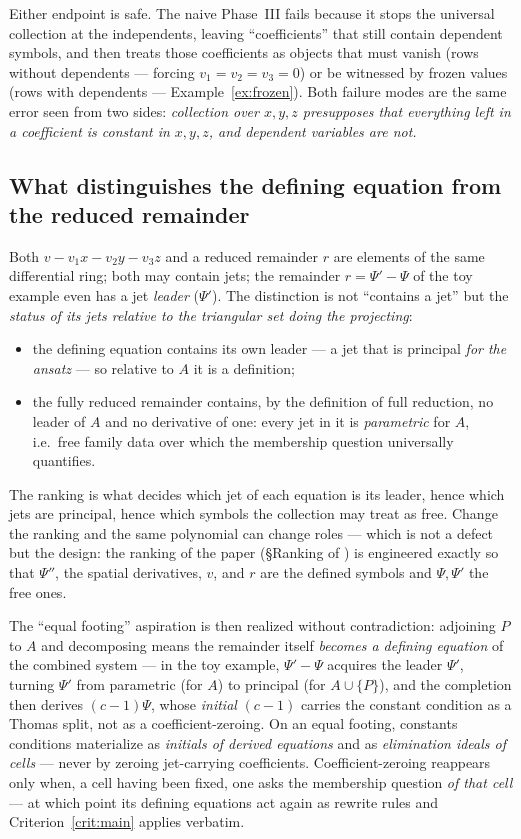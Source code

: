 \documentclass[11pt]{article}
\newcommand{\Psib}{\Psi}
\begin{document}
Either endpoint is safe. The naive Phase~III fails because it stops the
universal collection at the independents, leaving ``coefficients'' that still
contain dependent symbols, and then treats those coefficients as objects that
must vanish (rows without dependents --- forcing $v_1=v_2=v_3=0$) or be
witnessed by frozen values (rows with dependents --- Example~\ref{ex:frozen}).
Both failure modes are the same error seen from two sides: \emph{collection
over $x,y,z$ presupposes that everything left in a coefficient is constant in
$x,y,z$, and dependent variables are not.}

\subsection{What distinguishes the defining equation from the reduced
remainder}

Both $v - v_1x-v_2y-v_3z$ and a reduced remainder $r$ are elements of the same
differential ring; both may contain jets; the remainder $r = \Psib'-\Psib$ of
the toy example even has a jet \emph{leader} ($\Psib'$). The distinction is
not ``contains a jet'' but the \emph{status of its jets relative to the
triangular set doing the projecting}:
\begin{itemize}
\item the defining equation contains its own leader --- a jet that is
  principal \emph{for the ansatz} --- so relative to $A$ it is a definition;
\item the fully reduced remainder contains, by the definition of full
  reduction, no leader of $A$ and no derivative of one: every jet in it is
  \emph{parametric} for $A$, i.e.\ free family data over which the membership
  question universally quantifies.
\end{itemize}
The ranking is what decides which jet of each equation is its leader, hence
which jets are principal, hence which symbols the collection may treat as
free. Change the ranking and the same polynomial can change roles ---
which is not a defect but the design: the ranking of the paper
(\S{}Ranking of \cite{NewMethod}) is engineered exactly so that $\Psib''$,
the spatial derivatives, $v$, and $r$ are the defined symbols and
$\Psib,\Psib'$ the free ones.

The ``equal footing'' aspiration is then realized without contradiction:
adjoining $P$ to $A$ and decomposing means the remainder itself \emph{becomes
a defining equation} of the combined system --- in the toy example,
$\Psib'-\Psib$ acquires the leader $\Psib'$, turning $\Psib'$ from parametric
(for $A$) to principal (for $A\cup\{P\}$), and the completion then derives
$(c-1)\Psib$, whose \emph{initial} $(c-1)$ carries the constant condition as a
Thomas split, not as a coefficient-zeroing. On an equal footing, constants
conditions materialize as \emph{initials of derived equations} and as
\emph{elimination ideals of cells} --- never by zeroing jet-carrying
coefficients. Coefficient-zeroing reappears only when, a cell having been
fixed, one asks the membership question \emph{of that cell} --- at which point
its defining equations act again as rewrite rules and
Criterion~\ref{crit:main} applies verbatim.
\end{document}
